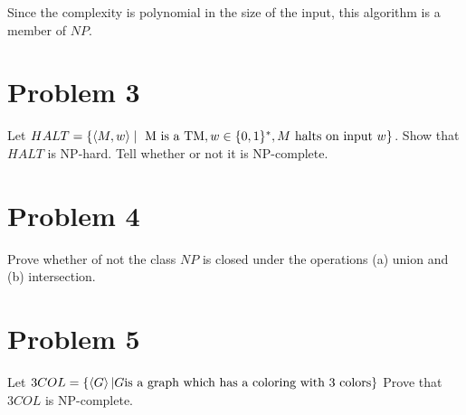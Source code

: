 \documentclass[12pt]{article}
\begin{document}
Since the complexity is polynomial in the size of the input, this algorithm is a member of $NP$.


\section*{Problem 3}
\begin{questionbox}
	Let $HALT = \{ \braket{M, w} \mid \text{ M is a TM}, w \in \{0,1\}^*, M \text { halts on input } w  \}$. Show that $HALT$ is NP-hard. Tell whether or not it is NP-complete.
\end{questionbox}


\section*{Problem 4}

\begin{questionbox}
		Prove whether of not the class $NP$ is closed under the operations (a) union and (b) intersection.
\end{questionbox}

\section*{Problem 5}

\begin{questionbox}
	Let $3COL = \{\braket{G} | G \text{is a graph which has a coloring with 3 colors} \}$ Prove that $3COL$ is
NP-complete.
\end{questionbox}
\end{document}
